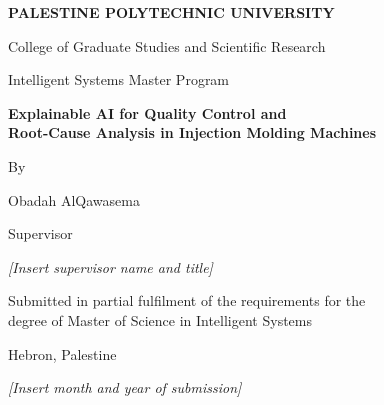 \begin{titlepage}
\centering

{\large\bfseries PALESTINE POLYTECHNIC UNIVERSITY\par}
\vspace{0.3em}
{\normalsize College of Graduate Studies and Scientific Research\par}
\vspace{0.3em}
{\normalsize Intelligent Systems Master Program\par}

\vspace{3cm}

{\Large\bfseries Explainable AI for Quality Control and\\[0.3em]
Root-Cause Analysis in Injection Molding Machines\par}

\vspace{3cm}

{\normalsize By\par}
\vspace{0.3em}
{\large Obadah AlQawasema\par}

\vspace{2cm}

{\normalsize Supervisor\par}
\vspace{0.3em}
{\large \textit{[Insert supervisor name and title]}\par}

\vfill

{\normalsize Submitted in partial fulfilment of the requirements for the\\
degree of Master of Science in Intelligent Systems\par}

\vspace{1.5cm}

{\normalsize Hebron, Palestine\par}
{\normalsize \textit{[Insert month and year of submission]}\par}

\end{titlepage}

